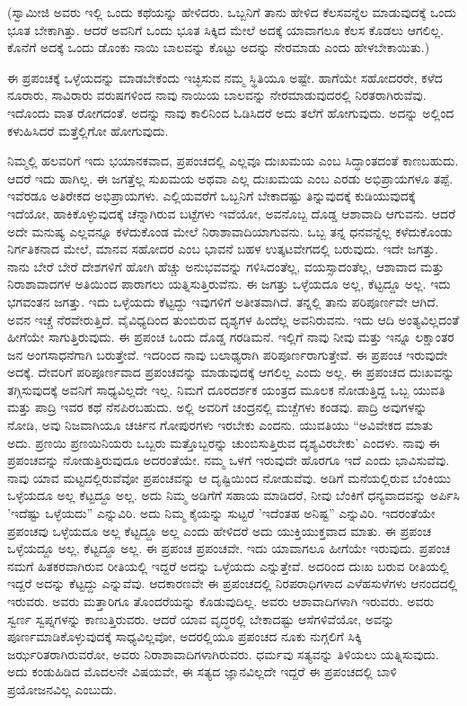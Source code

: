 (ಸ್ವಾಮೀಜಿ ಅವರು ಇಲ್ಲಿ ಒಂದು ಕಥೆಯನ್ನು ಹೇಳಿದರು. ಒಬ್ಬನಿಗೆ ತಾನು ಹೇಳಿದ ಕೆಲಸವನ್ನೆಲ ಮಾಡುವುದಕ್ಕೆ ಒಂದು ಭೂತ ಬೇಕಾಗಿತ್ತು. ಆದರೆ ಅವನಿಗೆ ಒಂದು ಭೂತ ಸಿಕ್ಕಿದ ಮೇಲೆ ಅದಕ್ಕೆ ಯಾವಾಗಲೂ ಕೆಲಸ ಕೊಡಲು ಆಗಲಿಲ್ಲ. ಕೊನೆಗೆ ಅದಕ್ಕೆ ಒಂದು ಡೊಂಕು ನಾಯಿ ಬಾಲವನ್ನು ಕೊಟ್ಟು ಅದನ್ನು ನೇರಮಾಡು ಎಂದು ಹೇಳಬೇಕಾಯಿತು.)

ಈ ಪ್ರಪಂಚಕ್ಕೆ ಒಳ್ಳೆಯದನ್ನು ಮಾಡಬೇಕೆಂದು ಇಚ್ಛಿಸುವ ನಮ್ಮ ಸ್ಥಿತಿಯೂ ಅಷ್ಟೇ. ಹಾಗೆಯೇ ಸಹೋದರರೇ, ಕಳೆದ ನೂರಾರು, ಸಾವಿರಾರು ವರುಷಗಳಿಂದ ನಾವು ನಾಯಿಯ ಬಾಲವನ್ನು ನೇರಮಾಡುವುದರಲ್ಲಿ ನಿರತರಾಗಿರುವೆವು. ಇದೊಂದು ವಾತ ರೋಗದಂತೆ. ಅದನ್ನು ನಾವು ಕಾಲಿನಿಂದ ಓಡಿಸಿದರೆ ಅದು ತಲೆಗೆ ಹೋಗುವುದು. ಅದನ್ನು ಅಲ್ಲಿಂದ ಕಳುಹಿಸಿದರೆ ಮತ್ತೆಲ್ಲಿಗೋ ಹೋಗುವುದು.

ನಿಮ್ಮಲ್ಲಿ ಹಲವರಿಗೆ ಇದು ಭಯಾನಕವಾದ, ಪ್ರಪಂಚದಲ್ಲಿ ಎಲ್ಲವೂ ದುಃಖಮಯ ಎಂಬ ಸಿದ್ಧಾಂತದಂತೆ ಕಾಣಬಹುದು. ಆದರೆ ಇದು ಹಾಗಿಲ್ಲ. ಈ ಜಗತ್ತೆಲ್ಲ ಸುಖಮಯ ಅಥವಾ ಎಲ್ಲ ದುಃಖಮಯ ಎಂಬ ಎರಡು ಅಭಿಪ್ರಾಯಗಳೂ ತಪ್ಪೆ. ಇವೆರಡೂ ಅತಿರೇಕದ ಅಭಿಪ್ರಾಯಗಳು. ಎಲ್ಲಿಯವರೆಗೆ ಒಬ್ಬನಿಗೆ ಬೇಕಾದಷ್ಟು ತಿನ್ನುವುದಕ್ಕೆ ಕುಡಿಯುವುದಕ್ಕೆ ಇದೆಯೋ, ಹಾಕಿಕೊಳ್ಳುವುದಕ್ಕೆ ಚೆನ್ನಾಗಿರುವ ಬಟ್ಟೆಗಳು ಇವೆಯೋ, ಅವನೊಬ್ಬ ದೊಡ್ಡ ಆಶಾವಾದಿ ಆಗುವನು. ಆದರೆ ಅದೇ ಮನುಷ್ಯ ಎಲ್ಲವನ್ನೂ ಕಳೆದುಕೊಂಡ ಮೇಲೆ ನಿರಾಶಾವಾದಿಯಾಗುವನು. ಒಬ್ಬ ತನ್ನ ಧನವನ್ನೆಲ್ಲ ಕಳೆದುಕೊಂಡು ನಿರ್ಗತಿಕನಾದ ಮೇಲೆ, ಮಾನವ ಸಹೋದರ ಎಂಬ ಭಾವನೆ ಬಹಳ ಉತ್ಕಟವೇಗದಲ್ಲಿ ಬರುವುದು. ಇದೇ ಜಗತ್ತು. ನಾನು ಬೇರೆ ಬೇರೆ ದೇಶಗಳಿಗೆ ಹೋಗಿ ಹೆಚ್ಚು ಅನುಭವವನ್ನು ಗಳಿಸಿದಂತೆಲ್ಲ, ವಯಸ್ಸಾದಂತೆಲ್ಲ, ಆಶಾವಾದ ಮತ್ತು ನಿರಾಶಾವಾದಗಳ ಅತಿಯಿಂದ ಪಾರಾಗಲು ಯತ್ನಿಸುತ್ತಿರುವೆನು. ಈ ಜಗತ್ತು ಒಳ್ಳೆಯದೂ ಅಲ್ಲ, ಕೆಟ್ಟದ್ದೂ ಅಲ್ಲ. ಇದು ಭಗವಂತನ ಜಗತ್ತು. ಇದು ಒಳ್ಳೆಯದು ಕೆಟ್ಟದ್ದು ಇವುಗಳಿಗೆ ಅತೀತವಾಗಿದೆ. ತನ್ನಲ್ಲಿ ತಾನು ಪರಿಪೂರ್ಣವೇ ಆಗಿದೆ. ಅವನ ಇಚ್ಚೆ ನೆರವೇರುತ್ತಿದೆ. ವೈವಿಧ್ಯದಿಂದ ತುಂಬಿರುವ ದೃಶ್ಯಗಳ ಹಿಂದೆಲ್ಲ ಅವನಿರುವನು. ಇದು ಆದಿ ಅಂತ್ಯವಿಲ್ಲದಂತೆ ಹೀಗೆಯೇ ಸಾಗುತ್ತಿರುವುದು. ಈ ಪ್ರಪಂಚ ಒಂದು ದೊಡ್ಡ ಗರಡಿಮನೆ. ಇಲ್ಲಿಗೆ ನಾವು ನೀವು ಮತ್ತು ಇನ್ನೂ ಲಕ್ಷಾಂತರ ಜನ ಅಂಗಸಾಧನೆಗಾಗಿ ಬರುತ್ತೇವೆ. ಇದರಿಂದ ನಾವು ಬಲಾಢ್ಯರಾಗಿ ಪರಿಪೂರ್ಣರಾಗುತ್ತೇವೆ. ಈ ಪ್ರಪಂಚ ಇರುವುದೇ ಅದಕ್ಕೆ. ದೇವರಿಗೆ ಪರಿಪೂರ್ಣವಾದ ಪ್ರಪಂಚವನ್ನು ಮಾಡುವುದಕ್ಕೆ ಆಗಲಿಲ್ಲ ಎಂದು ಅಲ್ಲ. ಈ ಪ್ರಪಂಚದ ದುಃಖವನ್ನು ತಗ್ಗಿಸುವುದಕ್ಕೆ ಅವನಿಗೆ ಸಾಧ್ಯವಿಲ್ಲದೇ ಇಲ್ಲ. ನಿಮಗೆ ದೂರದರ್ಶಕ ಯಂತ್ರದ ಮೂಲಕ ನೋಡುತ್ತಿದ್ದ ಒಬ್ಬ ಯುವತಿ ಮತ್ತು ಪಾದ್ರಿ ಇವರ ಕಥೆ ನೆನಪಿರಬಹುದು. ಅಲ್ಲಿ ಅವರಿಗೆ ಚಂದ್ರನಲ್ಲಿ ಮಚ್ಚೆಗಳು ಕಂಡವು. ಪಾದ್ರಿ ಅವುಗಳನ್ನು ನೋಡಿ, ಅವು ನಿಜವಾಗಿಯೂ ಚರ್ಚಿನ ಗೋಪುರಗಳು ಇರಬೇಕು ಎಂದನು. ಯುವತಿಯು “ಅವಿವೇಕದ ಮಾತು ಅದು. ಪ್ರಣಯಿ ಪ್ರಣಯಿನಿಯರು ಒಬ್ಬರು ಮತ್ತೊಬ್ಬರನ್ನು ಚುಂಬಿಸುತ್ತಿರುವ ದೃಶ್ಯವಿರಬೇಕು' ಎಂದಳು. ನಾವು ಈ ಪ್ರಪಂಚವನ್ನು ನೋಡುತ್ತಿರುವುದೂ ಅದರಂತೆಯೇ. ನಮ್ಮ ಒಳಗೆ ಇರುವುದೇ ಹೊರಗೂ ಇದೆ ಎಂದು ಭಾವಿಸುವೆವು. ನಾವು ಯಾವ ಮಟ್ಟದಲ್ಲಿರುವೆವೋ ಪ್ರಪಂಚವನ್ನು ಆ ದೃಷ್ಟಿಯಿಂದ ನೋಡುವೆವು. ಅಡಿಗೆ ಮನೆಯಲ್ಲಿರುವ ಬೆಂಕಿಯು ಒಳ್ಳೆಯದೂ ಅಲ್ಲ ಕೆಟ್ಟದ್ದೂ ಅಲ್ಲ. ಅದು ನಿಮ್ಮ ಅಡಿಗೆಗೆ ಸಹಾಯ ಮಾಡಿದರೆ, ನೀವು ಬೆಂಕಿಗೆ ಧನ್ಯವಾದವನ್ನು ಅರ್ಪಿಸಿ 'ಇದೆಷ್ಟು ಒಳ್ಳೆಯದು'' ಎನ್ನುವಿರಿ. ಅದು ನಿಮ್ಮ ಕೈಯನ್ನು ಸುಟ್ಟರೆ 'ಇದೆಂತಹ ಅನಿಷ್ಟ'' ಎನ್ನುವಿರಿ. ಇದರಂತೆಯೇ ಪ್ರಪಂಚವು ಒಳ್ಳೆಯದೂ ಅಲ್ಲ ಕೆಟ್ಟದ್ದೂ ಅಲ್ಲ ಎಂದು ಹೇಳಿದರೆ ಅದು ಯುಕ್ತಿಯುಕ್ತವಾದ ಮಾತು. ಈ ಪ್ರಪಂಚ ಒಳ್ಳೆಯದ್ದೂ ಅಲ್ಲ, ಕೆಟ್ಟದ್ದೂ ಅಲ್ಲ. ಈ ಪ್ರಪಂಚ ಪ್ರಪಂಚವೇ. ಇದು ಯಾವಾಗಲೂ ಹೀಗೆಯೇ ಇರುವುದು. ಪ್ರಪಂಚ ನಮಗೆ ಹಿತಕರವಾಗಿರುವ ರೀತಿಯಲ್ಲಿ ಇದ್ದರೆ ಅದನ್ನು ಒಳ್ಳೆಯದು ಎನ್ನುತ್ತೇವೆ. ಅದರಿಂದ ದುಃಖ ಬರುವ ರೀತಿಯಲ್ಲಿ ಇದ್ದರೆ ಅದನ್ನು ಕೆಟ್ಟದ್ದು ಎನ್ನುವೆವು. ಆದಕಾರಣವೇ ಈ ಪ್ರಪಂಚದಲ್ಲಿ ನಿರಪರಾಧಿಗಳಾದ ಎಳೆಹಸುಳೆಗಳು ಆನಂದದಲ್ಲಿ ಇರುವರು. ಅವರು ಮತ್ತಾರಿಗೂ ತೊಂದರೆಯನ್ನು ಕೊಡುವುದಿಲ್ಲ. ಅವರು ಆಶಾವಾದಿಗಳಾಗಿ ಇರುವರು. ಅವರು ಸ್ವರ್ಣ ಸ್ವಪ್ನಗಳನ್ನು ಕಾಣುತ್ತಿರುವರು. ಆದರೆ ಯಾವ ವೃದ್ಧರಲ್ಲಿ ಬೇಕಾದಷ್ಟು ಆಸೆಗಳಿವೆಯೋ, ಅವನ್ನು ಪೂರ್ಣಮಾಡಿಕೊಳ್ಳುವುದಕ್ಕೆ ಸಾಧ್ಯವಿಲ್ಲವೋ, ಅದರಲ್ಲಿಯೂ ಪ್ರಪಂಚದ ನೂಕು ನುಗ್ಗಲಿಗೆ ಸಿಕ್ಕಿ ಜರ್ಝರಿತರಾಗಿರುವರೋ, ಅವರು ನಿರಾಶಾವಾದಿಗಳಾಗಿರುವರು. ಧರ್ಮವು ಸತ್ಯವನ್ನು ತಿಳಿಯಲು ಯತ್ನಿಸುವುದು. ಅದು ಕಂಡುಹಿಡಿದ ಮೊದಲನೇ ವಿಷಯವೇ, ಈ ಸತ್ಯದ ಜ್ಞಾನವಿಲ್ಲದೇ ಇದ್ದರೆ ಈ ಪ್ರಪಂಚದಲ್ಲಿ ಬಾಳಿ ಪ್ರಯೋಜನವಿಲ್ಲ ಎಂಬುದು.

